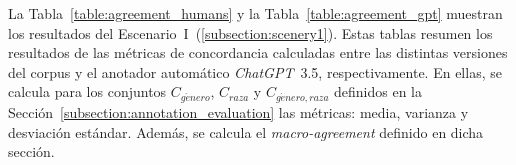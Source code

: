 La Tabla~\ref{table:agreement_humans} y la Tabla~\ref{table:agreement_gpt} muestran los resultados del 
Escenario~I~(\ref{subsection:scenery1}).
Estas tablas resumen los resultados de las m\'etricas de concordancia calculadas entre las distintas
versiones del corpus y el anotador autom\'atico \emph{ChatGPT}~3.5, respectivamente. En ellas, se 
calcula para los conjuntos $C_{g\acute{e}nero}$, $C_{raza}$ y $C_{g\acute{e}nero, raza}$ definidos
en la Secci\'on~\ref{subsection:annotation_evaluation} las m\'etricas: media, varianza y desviaci\'on
est\'andar. Adem\'as, se calcula el \emph{macro-agreement} definido en dicha secci\'on.

\begin{table}[htpb]
    \centering
    \caption{Resumen de m\'etricas de concordancia entre las distintas versiones del corpus.}
    \label{table:agreement_humans}
\end{table}

